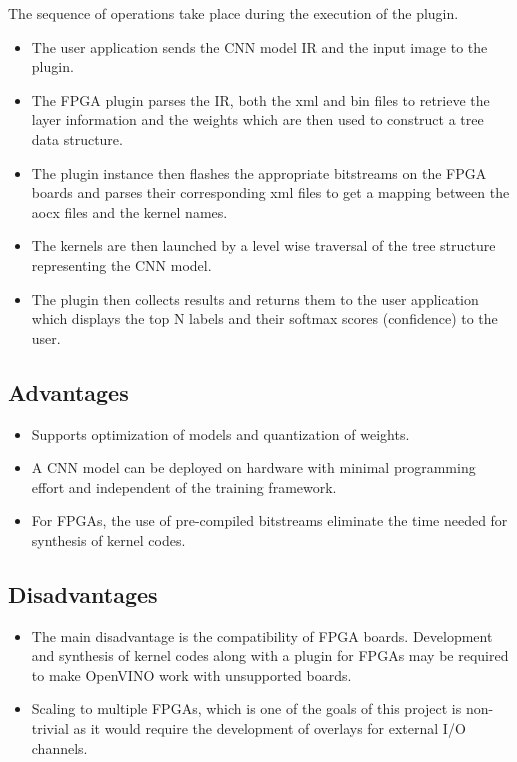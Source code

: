  The sequence of operations take place during the execution of the plugin.
 
 \begin{itemize}
     \item The user application sends the CNN model IR and the input image to the plugin.
     \item The FPGA plugin parses the IR, both the xml and bin files to retrieve the layer information and the weights which are then used to construct a tree data structure.
     \item The plugin instance then flashes the appropriate bitstreams on the FPGA boards and parses their corresponding xml files to get a mapping between the aocx files and the kernel names.
     \item The kernels are then launched by a level wise traversal of the tree structure representing the CNN model.
     \item The plugin then collects results and returns them to the user application which displays the top N labels and their softmax scores (confidence) to the user.
 \end{itemize}
 
 \subsection{Advantages}
  
 \begin{itemize}
 \item Supports optimization of models and quantization of weights.
 \item A CNN model can be deployed on hardware with minimal programming effort and independent of the training framework.
 \item For FPGAs, the use of pre-compiled bitstreams eliminate the time needed for synthesis of kernel codes.
 \end{itemize}
 
 \subsection{Disadvantages}
 \begin{itemize}
 \item The main disadvantage is the compatibility of FPGA boards. Development and synthesis of kernel codes along with a plugin for FPGAs may be required to make OpenVINO work with unsupported boards. 
 \item Scaling to multiple FPGAs, which is one of the goals of this project is non-trivial as it would require the development of overlays for external I/O channels. 
 \end{itemize}
